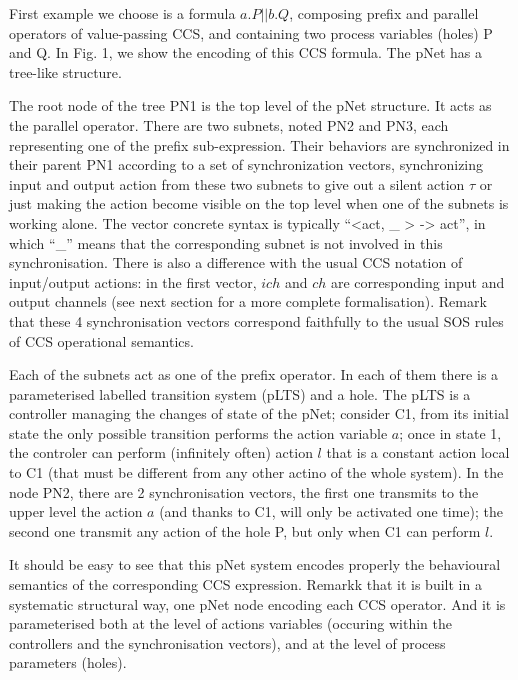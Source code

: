 \documentclass{lncs/llncs}
\begin{document}
First example we choose is a formula $a.P||b.Q$, composing prefix and
parallel operators of value-passing CCS, and containing two process
variables (holes) P and Q. In Fig. 1, we show the encoding of this CCS
formula. The pNet has a tree-like structure.  

The root node of the tree PN1 is the top level of the pNet
  structure. It acts as the parallel operator. There are two subnets,
  noted PN2 and PN3, each representing one of the prefix
  sub-expression. Their behaviors are synchronized in their parent PN1
  according to a set of synchronization vectors, synchronizing input
  and output action from these two subnets to give out a silent action
  $\tau$ or just making the action become visible on the top level when
  one of the subnets is working alone. The vector concrete syntax is typically
  ``<act, \_ > -> act'', in which ``\_'' means that the corresponding
  subnet is not involved in this synchronisation.
  There is also a difference with the usual CCS notation of
  input/output actions: in the first vector, $ich$ and $ch$ are
  corresponding input and output channels (see next section for a more
  complete formalisation). 
  Remark that these 4
  synchronisation vectors correspond faithfully to the usual SOS
  rules of CCS operational semantics.

  Each of the subnets act as one of the prefix operator.
In each of them there is a parameterised labelled transition system
(pLTS) and a hole. The pLTS is a controller managing the
changes of state of the pNet; consider C1, from its initial state the
only possible transition performs the action variable $a$; once in
state 1, the controler can perform (infinitely often) action $l$ that
is a constant action local to C1 (that must be different from any
other actino of the whole system). In the node PN2, there are 2
synchronisation vectors, the first one transmits to the upper level the
action $a$ (and thanks to C1, will only be activated one time); the
second one transmit any action of the hole P, but only when C1 can
perform $l$.

It should be easy to see that this pNet system encodes properly the
behavioural semantics of the corresponding CCS expression. Remarkk
that it is built in a systematic structural way, one pNet node
encoding each CCS operator. And it is parameterised both at the level
of actions variables (occuring within the controllers and the synchronisation
vectors), and at the level of process parameters 
(holes). 
\end{document}
